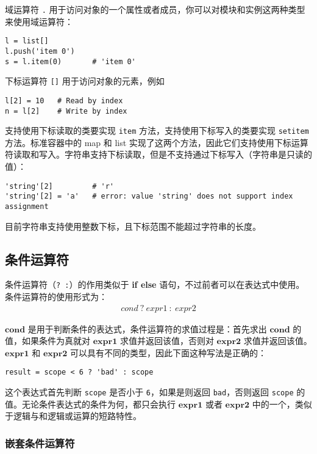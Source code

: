 域运算符 \texttt{.} 用于访问对象的一个属性或者成员，你可以对模块和实例这两种类型来使用域运算符：
\begin{lstlisting}[language=berry, numbers=none]
l = list[]
l.push('item 0')
s = l.item(0)       # 'item 0'
\end{lstlisting}

下标运算符 \texttt{[]} 用于访问对象的元素，例如
\begin{lstlisting}[language=berry, numbers=none]
l[2] = 10   # Read by index
n = l[2]    # Write by index
\end{lstlisting}

支持使用下标读取的类要实现 \texttt{item} 方法，支持使用下标写入的类要实现 \texttt{setitem} 方法。标准容器中的 map 和 list 实现了这两个方法，因此它们支持使用下标运算符读取和写入。字符串支持下标读取，但是不支持通过下标写入（字符串是只读的值）：
\begin{lstlisting}[language=berry, numbers=none]
'string'[2]         # 'r'
'string'[2] = 'a'   # error: value 'string' does not support index assignment
\end{lstlisting}

目前字符串支持使用整数下标，且下标范围不能超过字符串的长度。

\subsection{条件运算符}

条件运算符（\texttt{? :}）的作用类似于 \textbf{if else} 语句，不过前者可以在表达式中使用。条件运算符的使用形式为：\vspace{-0.5em}
\begin{gather*}
    cond\ \bm{?}\ expr1\ \bm{:}\ expr2
\end{gather*}

$\bm{cond}$ 是用于判断条件的表达式，条件运算符的求值过程是：首先求出 $\bm{cond}$ 的值，如果条件为真就对 $\bm{expr1}$ 求值并返回该值，否则对 $\bm{expr2}$ 求值并返回该值。$\bm{expr1}$ 和 $\bm{expr2}$ 可以具有不同的类型，因此下面这种写法是正确的：
\begin{lstlisting}[language=berry, numbers=none]
result = scope < 6 ? 'bad' : scope
\end{lstlisting}

这个表达式首先判断 \texttt{scope} 是否小于 \texttt{6}，如果是则返回 \texttt{bad}，否则返回 \texttt{scope} 的值。无论条件表达式的条件为何，都只会执行 $\bm{expr1}$ 或者 $\bm{expr2}$ 中的一个，类似于逻辑与和逻辑或运算的短路特性。

\subsubsection{嵌套条件运算符}


